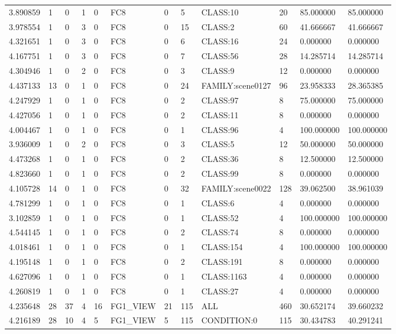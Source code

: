 \begin{tabular}{llllllllllll}
3.890859 & 1 & 0 & 1 & 0 & FC8 & 0 & 5 & CLASS:10 & 20 & 85.000000 & 85.000000 \\
3.978554 & 1 & 0 & 3 & 0 & FC8 & 0 & 15 & CLASS:2 & 60 & 41.666667 & 41.666667 \\
4.321651 & 1 & 0 & 3 & 0 & FC8 & 0 & 6 & CLASS:16 & 24 & 0.000000 & 0.000000 \\
4.167751 & 1 & 0 & 3 & 0 & FC8 & 0 & 7 & CLASS:56 & 28 & 14.285714 & 14.285714 \\
4.304946 & 1 & 0 & 2 & 0 & FC8 & 0 & 3 & CLASS:9 & 12 & 0.000000 & 0.000000 \\
4.437133 & 13 & 0 & 1 & 0 & FC8 & 0 & 24 & FAMILY:scene0127 & 96 & 23.958333 & 28.365385 \\
4.247929 & 1 & 0 & 1 & 0 & FC8 & 0 & 2 & CLASS:97 & 8 & 75.000000 & 75.000000 \\
4.427056 & 1 & 0 & 1 & 0 & FC8 & 0 & 2 & CLASS:11 & 8 & 0.000000 & 0.000000 \\
4.004467 & 1 & 0 & 1 & 0 & FC8 & 0 & 1 & CLASS:96 & 4 & 100.000000 & 100.000000 \\
3.936009 & 1 & 0 & 2 & 0 & FC8 & 0 & 3 & CLASS:5 & 12 & 50.000000 & 50.000000 \\
4.473268 & 1 & 0 & 1 & 0 & FC8 & 0 & 2 & CLASS:36 & 8 & 12.500000 & 12.500000 \\
4.823660 & 1 & 0 & 1 & 0 & FC8 & 0 & 2 & CLASS:99 & 8 & 0.000000 & 0.000000 \\
4.105728 & 14 & 0 & 1 & 0 & FC8 & 0 & 32 & FAMILY:scene0022 & 128 & 39.062500 & 38.961039 \\
4.781299 & 1 & 0 & 1 & 0 & FC8 & 0 & 1 & CLASS:6 & 4 & 0.000000 & 0.000000 \\
3.102859 & 1 & 0 & 1 & 0 & FC8 & 0 & 1 & CLASS:52 & 4 & 100.000000 & 100.000000 \\
4.544145 & 1 & 0 & 1 & 0 & FC8 & 0 & 2 & CLASS:74 & 8 & 0.000000 & 0.000000 \\
4.018461 & 1 & 0 & 1 & 0 & FC8 & 0 & 1 & CLASS:154 & 4 & 100.000000 & 100.000000 \\
4.195148 & 1 & 0 & 1 & 0 & FC8 & 0 & 2 & CLASS:191 & 8 & 0.000000 & 0.000000 \\
4.627096 & 1 & 0 & 1 & 0 & FC8 & 0 & 1 & CLASS:1163 & 4 & 0.000000 & 0.000000 \\
4.260819 & 1 & 0 & 1 & 0 & FC8 & 0 & 1 & CLASS:27 & 4 & 0.000000 & 0.000000 \\
4.235648 & 28 & 37 & 4 & 16 & FG1\_VIEW & 21 & 115 & ALL & 460 & 30.652174 & 39.660232 \\
4.216189 & 28 & 10 & 4 & 5 & FG1\_VIEW & 5 & 115 & CONDITION:0 & 115 & 30.434783 & 40.291241 \\

\end{tabular}

